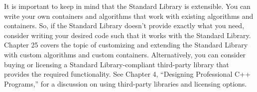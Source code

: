 It is important to keep in mind that the Standard Library is extensible. You can write your own containers and algorithms that work with existing algorithms and containers. So, if the Standard Library doesn’t provide exactly what you need, consider writing your desired code such that it works with the Standard Library. Chapter 25 covers the topic of customizing and extending the Standard Library with custom algorithms and custom containers. Alternatively, you can consider buying or licensing a Standard Library-compliant third-party library that provides the required functionality. See Chapter 4, “Designing Professional C++ Programs,” for a discussion on using third-party libraries and licensing options.






